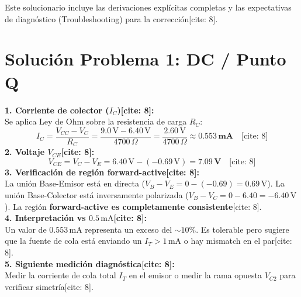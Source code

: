 \documentclass[11pt, a4paper]{article}
\begin{document}
\begin{tcolorbox}[colback=red!5, colframe=red!70!black, title=\textbf{Material Reservado Docente: Solucionario de Evaluación EC2}]
    Este solucionario incluye las derivaciones explícitas completas y las expectativas de diagnóstico (Troubleshooting) para la corrección[cite: 8].
\end{tcolorbox}

\section*{Solución Problema 1: DC / Punto Q}
\textbf{1. Corriente de colector ($I_C$)[cite: 8]:} \\
Se aplica Ley de Ohm sobre la resistencia de carga $R_C$:
\begin{equation*}
    I_C = \frac{V_{CC} - V_C}{R_C} = \frac{9.0\,\text{V} - 6.40\,\text{V}}{4700\,\Omega} = \frac{2.60\,\text{V}}{4700\,\Omega} \approx \mathbf{0.553\,\text{mA}} \quad \text{[cite: 8]}
\end{equation*}
\textbf{2. Voltaje $V_{CE}$[cite: 8]:}
\begin{equation*}
    V_{CE} = V_C - V_E = 6.40\,\text{V} - (-0.69\,\text{V}) = \mathbf{7.09\,\text{V}} \quad \text{[cite: 8]}
\end{equation*}
\textbf{3. Verificación de región forward-active[cite: 8]:} \\
La unión Base-Emisor está en directa ($V_B - V_E = 0 - (-0.69) = 0.69\,\text{V}$). La unión Base-Colector está inversamente polarizada ($V_B - V_C = 0 - 6.40 = -6.40\,\text{V}$). La región \textbf{forward-active es completamente consistente}[cite: 8]. \\
\textbf{4. Interpretación vs $0.5\,\text{mA}$[cite: 8]:} \\
Un valor de $0.553\,\text{mA}$ representa un exceso del $\sim 10\%$. Es tolerable pero sugiere que la fuente de cola está enviando un $I_T > 1\,\text{mA}$ o hay mismatch en el par[cite: 8]. \\
\textbf{5. Siguiente medición diagnóstica[cite: 8]:} \\
Medir la corriente de cola total $I_T$ en el emisor o medir la rama opuesta $V_{C2}$ para verificar simetría[cite: 8].
\end{document}
